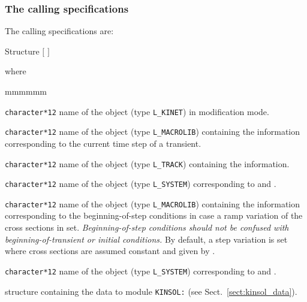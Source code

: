 \subsubsection{The calling specifications}

The calling specifications are:

\begin{DataStructure}{Structure }
 \moc{:=}      $[$   $]$
\moc{::} 
\end{DataStructure}

\noindent where
\begin{ListeDeDescription}{mmmmmm}

\item[\dusa{KINET}] {\tt character*12} name of the  object (type {\tt L\_KINET}) in modification mode.

\item[\dusa{MACRO}] {\tt character*12} name of the  object (type {\tt L\_MACROLIB}) containing the 
information corresponding to the current time step of a transient.

\item[\dusa{TRACK}] {\tt character*12} name of the  object (type {\tt L\_TRACK}) containing the  information.

\item[\dusa{SYST}] {\tt character*12} name of the  object (type {\tt L\_SYSTEM}) corresponding to  
and  .

\item[\dusa{MACRO\_0}] {\tt character*12} name of the  object (type {\tt L\_MACROLIB}) containing the 
information corresponding to the beginning-of-step conditions in case a ramp variation of the cross sections in set.
{\sl Beginning-of-step conditions should not be confused with beginning-of-transient or initial conditions.} By default,
a step variation is set where cross sections are assumed constant and given by .

\item[\dusa{SYST\_0}] {\tt character*12} name of the  object (type {\tt L\_SYSTEM}) corresponding to  
and  .

\item[\dstr{kinsol\_data}] structure containing the data to module {\tt KINSOL:} (see Sect.~\ref{sect:kinsol_data}).

\end{ListeDeDescription}

